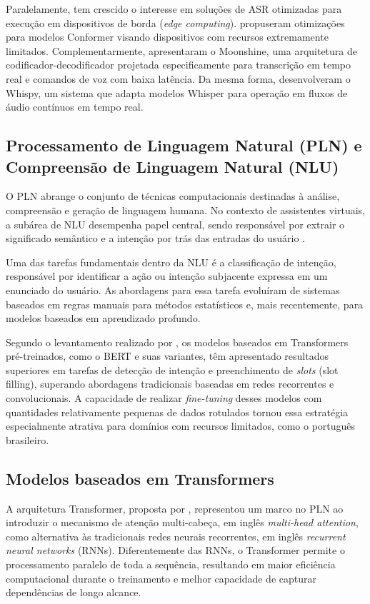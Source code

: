 \documentclass[
    12pt,                %
    openright,           %
    oneside,             %
    a4paper,             %
    english,             %
    brazil               %
]{abntex2}
\begin{document}
Paralelamente, tem crescido o interesse em soluções de ASR otimizadas para execução em dispositivos de borda (\textit{edge computing}).  propuseram otimizações para modelos Conformer visando dispositivos com recursos extremamente limitados. Complementarmente,  apresentaram o Moonshine, uma arquitetura de codificador-decodificador projetada especificamente para transcrição em tempo real e comandos de voz com baixa latência. Da mesma forma,  desenvolveram o Whispy, um sistema que adapta modelos Whisper para operação em fluxos de áudio contínuos em tempo real.

\subsection{Processamento de Linguagem Natural (PLN) e Compreensão de Linguagem Natural (NLU)}

O PLN abrange o conjunto de técnicas computacionais destinadas à análise, compreensão e geração de linguagem humana. No contexto de assistentes virtuais, a subárea de NLU desempenha papel central, sendo responsável por extrair o significado semântico e a intenção por trás das entradas do usuário \cite{Jurafsky2024}.

Uma das tarefas fundamentais dentro da NLU é a classificação de intenção, responsável por identificar a ação ou intenção subjacente expressa em um enunciado do usuário. As abordagens para essa tarefa evoluíram de sistemas baseados em regras manuais para métodos estatísticos e, mais recentemente, para modelos baseados em aprendizado profundo.

Segundo o levantamento realizado por , os modelos baseados em Transformers pré-treinados, como o BERT e suas variantes, têm apresentado resultados superiores em tarefas de detecção de intenção e preenchimento de \textit{slots} (slot filling), superando abordagens tradicionais baseadas em redes recorrentes e convolucionais. A capacidade de realizar \textit{fine-tuning} desses modelos com quantidades relativamente pequenas de dados rotulados tornou essa estratégia especialmente atrativa para domínios com recursos limitados, como o português brasileiro.

\subsection{Modelos baseados em Transformers}

A arquitetura Transformer, proposta por , representou um marco no PLN ao introduzir o mecanismo de atenção multi-cabeça, em inglês \textit{multi-head attention}, como alternativa às tradicionais redes neurais recorrentes, em inglês \textit{recurrent neural networks} (RNNs). Diferentemente das RNNs, o Transformer permite o processamento paralelo de toda a sequência, resultando em maior eficiência computacional durante o treinamento e melhor capacidade de capturar dependências de longo alcance.
\end{document}
